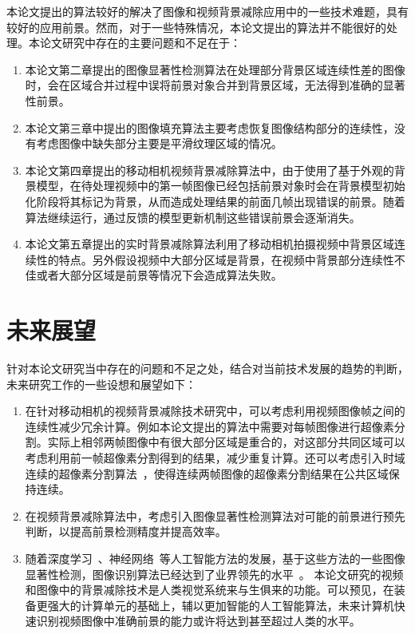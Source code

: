 本论文提出的算法较好的解决了图像和视频背景减除应用中的一些技术难题，具有较好的应用前景。然而，对于一些特殊情况，本论文提出的算法并不能很好的处理。本论文研究中存在的主要问题和不足在于：
\begin{enumerate}
  \item 本论文第二章提出的图像显著性检测算法在处理部分背景区域连续性差的图像时，会在区域合并过程中误将前景对象合并到背景区域，无法得到准确的显著性前景。
  \item 本论文第三章中提出的图像填充算法主要考虑恢复图像结构部分的连续性，没有考虑图像中缺失部分主要是平滑纹理区域的情况。
  \item 本论文第四章提出的移动相机视频背景减除算法中，由于使用了基于外观的背景模型，在待处理视频中的第一帧图像已经包括前景对象时会在背景模型初始化阶段将其标记为背景，从而造成处理结果的前面几帧出现错误的前景。随着算法继续运行，通过反馈的模型更新机制这些错误前景会逐渐消失。

  \item 本论文第五章提出的实时背景减除算法利用了移动相机拍摄视频中背景区域连续性的特点。另外假设视频中大部分区域是背景，在视频中背景部分连续性不佳或者大部分区域是前景等情况下会造成算法失败。

\end{enumerate}
\section{未来展望}
\label{ch6:sec:futureWorks}
针对本论文研究当中存在的问题和不足之处，结合对当前技术发展的趋势的判断，未来研究工作的一些设想和展望如下：
\begin{enumerate}
  \item 在针对移动相机的视频背景减除技术研究中，可以考虑利用视频图像帧之间的连续性减少冗余计算。例如本论文提出的算法中需要对每帧图像进行超像素分割。实际上相邻两帧图像中有很大部分区域是重合的，对这部分共同区域可以考虑利用前一帧超像素分割得到的结果，减少重复计算。还可以考虑引入时域连续的超像素分割算法~\cite{tsp}，使得连续两帧图像的超像素分割结果在公共区域保持连续。
  \item 在视频背景减除算法中，考虑引入图像显著性检测算法对可能的前景进行预先判断，以提高前景检测精度并提高效率。
  \item 随着深度学习~\cite{DeepLearning}、神经网络~\cite{nerualNetworks}等人工智能方法的发展，基于这些方法的一些图像显著性检测，图像识别算法已经达到了业界领先的水平~\cite{NIPS2014_5547,DISC,ImageNet}。 本论文研究的视频和图像中的背景减除技术是人类视觉系统来与生俱来的功能。可以预见，在装备更强大的计算单元的基础上，辅以更加智能的人工智能算法，未来计算机快速识别视频图像中准确前景的能力或许将达到甚至超过人类的水平。
\end{enumerate}

